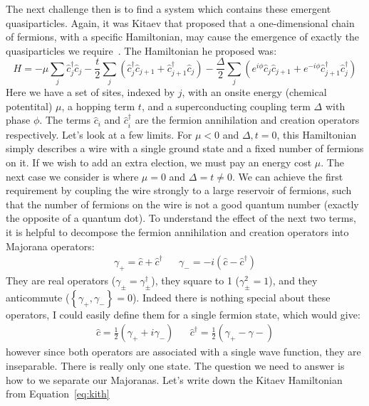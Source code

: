 The next challenge then is to find a system which contains these emergent quasiparticles. Again, it was Kitaev that proposed that
a one-dimensional chain of fermions, with a specific Hamiltonian, may cause the emergence of exactly the quasiparticles we require~\cite{Kitaev_2001}.
The Hamiltonian he proposed was\cite{Alicea_2012}:
\begin{equation}
  H = -\mu\sum_j \hat c_j^\dagger \hat c_j - \frac{t}{2}\sum_j\left(\hat c_j^\dagger \hat c_{j+1} + \hat c_{j+1}^\dagger \hat c_j\right)
      -\frac{\Delta}{2}\sum_j\left(e^{i\phi}\hat c_j\hat c_{j+1} + e^{-i\phi} \hat c_{j+1}^\dagger \hat c_j^\dagger\right)
  \label{eq:kith}
\end{equation}
Here we have a set of sites, indexed by $j$, with an onsite energy (chemical potentital) $\mu$, a hopping term $t$, and a superconducting coupling
term $\Delta$ with phase $\phi$. The terms $\hat c_i$ and $\hat c_i^\dagger$ are the fermion annihilation and creation operators respectively.
Let's look at a few limits. For $\mu < 0$ and $\Delta, t = 0$, this Hamiltonian simply describes a wire with a single ground state and a fixed
number of fermions on it. If we wish to add an extra election, we must pay an energy cost $\mu$. The next case we consider is where $\mu=0$ and
$\Delta = t \neq 0$. We can achieve the first requirement by coupling the wire strongly to a large reservoir of fermions, such that the number of
fermions on the wire is not a good quantum number (exactly the opposite of a quantum dot). To understand the effect of the next two terms, it is
helpful to decompose the fermion annihilation and creation operators into Majorana operators:
\begin{align}
  \gamma_+ = \hat c + \hat c^\dagger && \gamma_- = -i(\hat c - \hat c^\dagger)
\end{align}
They are real operators ($\gamma_\pm = \gamma_\pm^\dagger$), they square to 1 ($\gamma_\pm^2 = 1$), and they anticommute ($\left\{\gamma_+, \gamma_-\right\} = 0$).
Indeed there is nothing special about these operators, I could easily define them for a single fermion state, which would give:
\begin{align}
  \hat c = \frac{1}{2}(\gamma_{+} + i\gamma_{-}) && \hat c^\dagger = \frac{1}{2}(\gamma_{+} - \gamma{-})
\end{align}
however since both operators are associated with a single wave function, they are inseparable. There is really only one state.
The question we need to answer is how to we separate our Majoranas. Let's write down the Kitaev Hamiltonian from Equation~\ref{eq:kith}
